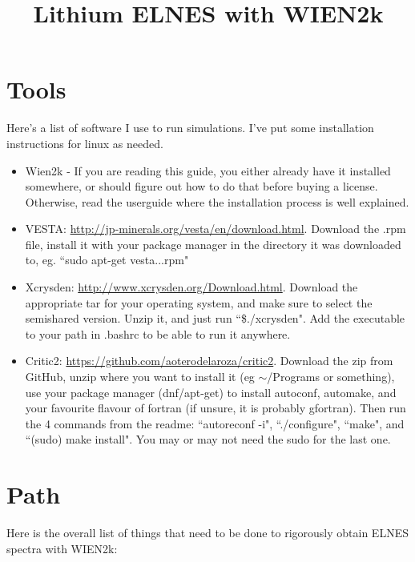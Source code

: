 \documentclass[12pt]{article}
\title{Lithium ELNES with WIEN2k}
\begin{document}
\maketitle

\tableofcontents

\section{Tools}	
Here's a list of software I use to run simulations.  I've put some installation instructions for linux as needed.  

\begin{itemize}
	\item Wien2k  - If you are reading this guide, you either already have it installed somewhere, or should figure out how to do that before buying a license.  Otherwise, read the userguide where the installation process is well explained. 
	
	\item  VESTA: \url{http://jp-minerals.org/vesta/en/download.html}.  Download the .rpm file, install it with your package manager in the directory it was downloaded to, eg. ``sudo apt-get vesta...rpm"
	
	\item Xcrysden: \url{http://www.xcrysden.org/Download.html}.  Download the appropriate tar for your operating system, and make sure to select the semishared version.  Unzip it, and just run ``\$./xcrysden".  Add the executable to your path in .bashrc to be able to run it anywhere.
	
	\item Critic2: \url{https://github.com/aoterodelaroza/critic2}.  Download the zip from GitHub, unzip where you want to install it (eg $\sim$/Programs or something), use your package manager (dnf/apt-get) to install  autoconf, automake, and your favourite flavour of fortran (if unsure, it is probably gfortran).  Then run the 4 commands from the readme: ``autoreconf -i", ``./configure", ``make", and ``(sudo) make install".   You may or may not need the sudo for the last one. 
	
\end{itemize}
	
\section{Path}
Here is the overall list of things that need to be done to rigorously obtain ELNES spectra with WIEN2k:
\end{document}
